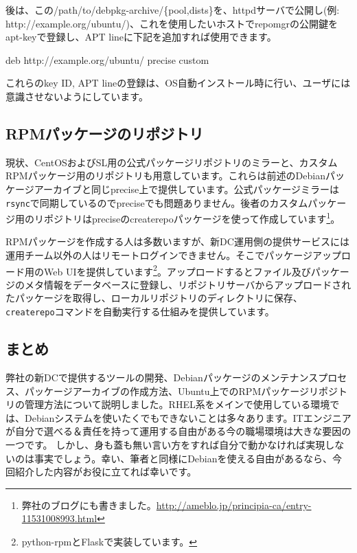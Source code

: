 \documentclass[mingoth,a4paper,twoside]{jsarticle}
\begin{document}
後は、この/path/to/debpkg-archive/\{pool,dists\}を、httpdサーバで公開し(例: http://example.org/ubuntu/)、これを使用したいホストでrepomgrの公開鍵をapt-keyで登録し、APT lineに下記を追加すれば使用できます。

\begin{commandline}
deb http://example.org/ubuntu/ precise custom
\end{commandline}

これらのkey ID, APT lineの登録は、OS自動インストール時に行い、ユーザには意識させないようにしています。

\vspace{-.5em}
\subsection{RPMパッケージのリポジトリ}

現状、CentOSおよびSL用の公式パッケージリポジトリのミラーと、カスタムRPMパッケージ用のリポジトリも用意しています。これらは前述のDebianパッケージアーカイブと同じprecise上で提供しています。公式パッケージミラーは\texttt{rsync}で同期しているのでpreciseでも問題ありません。後者のカスタムパッケージ用のリポジトリはpreciseのcreaterepoパッケージを使って作成しています\footnote{弊社のブログにも書きました。\url{http://ameblo.jp/principia-ca/entry-11531008993.html}}。

RPMパッケージを作成する人は多数いますが、新DC運用側の提供サービスには運用チーム以外の人はリモートログインできません。そこでパッケージアップロード用のWeb UIを提供しています\footnote{python-rpmとFlaskで実装しています。}。アップロードするとファイル及びパッケージのメタ情報をデータベースに登録し、リポジトリサーバからアップロードされたパッケージを取得し、ローカルリポジトリのディレクトリに保存、\texttt{createrepo}コマンドを自動実行する仕組みを提供しています。

\vspace{-.5em}
\subsection{まとめ}

弊社の新DCで提供するツールの開発、Debianパッケージのメンテナンスプロセス、パッケージアーカイブの作成方法、Ubuntu上でのRPMパッケージリポジトリの管理方法について説明しました。RHEL系をメインで使用している環境では、Debianシステムを使いたくでもできないことは多々あります。ITエンジニアが自分で選べる＆責任を持って運用する自由がある今の職場環境は大きな要因の一つです。
しかし、身も蓋も無い言い方をすれば自分で動かなければ実現しないのは事実でしょう。幸い、筆者と同様にDebianを使える自由があるなら、今回紹介した内容がお役に立てれば幸いです。
\end{document}
